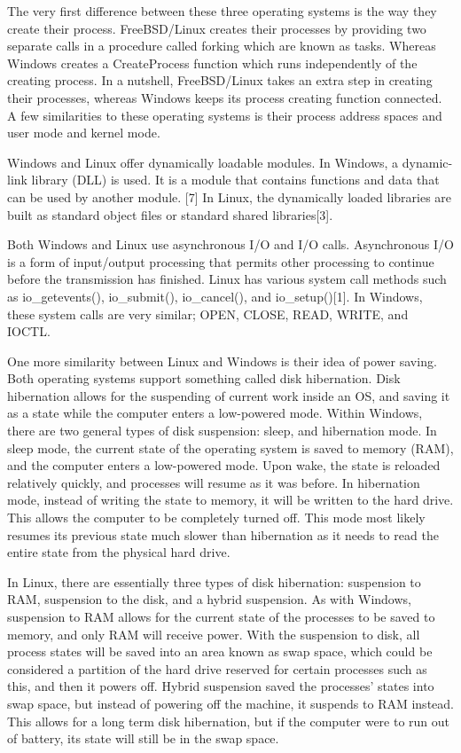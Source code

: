 \documentclass[onecolumn, draftclsnofoot,10pt, compsoc]{IEEEtran}
\begin{document}
The very first difference between these three operating systems is the way they create their process. FreeBSD/Linux creates their processes by providing two separate calls in a procedure called forking which are known as tasks. Whereas Windows creates a CreateProcess function which runs independently of the creating process. In a nutshell, FreeBSD/Linux takes an extra step in creating their processes, whereas Windows keeps its process creating function connected. A few similarities to these operating systems is their process address spaces and user mode and kernel mode.

Windows and Linux offer dynamically loadable modules. In Windows, a dynamic-link library (DLL) is used. It is a module that contains functions and data that can be used by another module. [7] In Linux, the dynamically loaded libraries are built as standard object files or standard shared libraries[3].

Both Windows and Linux use asynchronous I/O and I/O calls. Asynchronous I/O is a form of input/output processing that permits other processing to continue before the transmission has finished. Linux has various system call methods such as io\_getevents(),  io\_submit(), io\_cancel(), and io\_setup()[1]. In Windows, these system calls are very similar; OPEN, CLOSE, READ, WRITE, and IOCTL.

One more similarity between Linux and Windows is their idea of power saving. Both operating systems support something called disk hibernation. Disk hibernation allows for the suspending of current work inside an OS, and saving it as a state while the computer enters a low-powered mode. Within Windows, there are two general types of disk suspension: sleep, and hibernation mode. In sleep mode, the current state of the operating system is saved to memory (RAM), and the computer enters a low-powered mode. Upon wake, the state is reloaded relatively quickly, and processes will resume as it was before. In hibernation mode, instead of writing the state to memory, it will be written to the hard drive. This allows the computer to be completely turned off. This mode most likely resumes its previous state much slower than hibernation as it needs to read the entire state from the physical hard drive. 

In Linux, there are essentially three types of disk hibernation: suspension to RAM, suspension to the disk, and a hybrid suspension. As with Windows, suspension to RAM allows for the current state of the processes to be saved to memory, and only RAM will receive power. With the suspension to disk, all process states will be saved into an area known as swap space, which could be considered a partition of the hard drive reserved for certain processes such as this, and then it powers off. Hybrid suspension saved the processes’ states into swap space, but instead of powering off the machine, it suspends to RAM instead. This allows for a long term disk hibernation, but if the computer were to run out of battery, its state will still be in the swap space.
\end{document}
